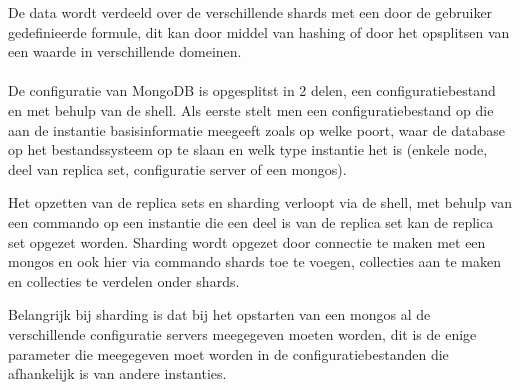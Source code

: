 De data wordt verdeeld over de verschillende shards met een door de gebruiker gedefinieerde formule, dit kan door middel van hashing of door het opsplitsen van een waarde in verschillende domeinen. 

\paragraph{} De configuratie van MongoDB is opgesplitst in 2 delen, een configuratiebestand en met behulp van de shell. Als eerste stelt men een configuratiebestand op die aan de instantie basisinformatie meegeeft zoals op welke poort, waar de database op het bestandssysteem op te slaan en welk type instantie het is (enkele node, deel van replica set, configuratie server of een mongos). 

Het opzetten van de replica sets en sharding verloopt via de shell, met behulp van een commando op een instantie die een deel is van de replica set kan de replica set opgezet worden. 
Sharding wordt opgezet door connectie te maken met een mongos en ook hier via commando shards toe te voegen, collecties aan te maken en collecties te verdelen onder shards.

Belangrijk bij sharding is dat bij het opstarten van een mongos al de verschillende configuratie servers meegegeven moeten worden, dit is de enige parameter die meegegeven moet worden in de configuratiebestanden die afhankelijk is van andere instanties. 

